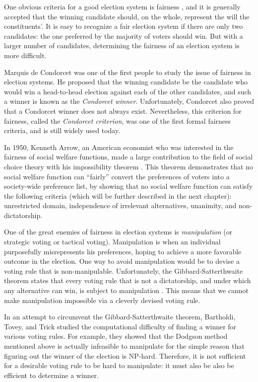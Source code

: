 	One obvious criteria for a good election system is fairness \cite{chevaleyre2006issues}, and it is generally accepted that the winning candidate should, on the whole, represent the will the constituents'. It is easy to recognize a fair election system if there are only two candidates: the one preferred by the majority of voters should win. But with a larger number of candidates, determining the fairness of an election system is more difficult.

	Marquis de Condorcet was one of the first people to study the issue of fairness in election systems. He proposed that the winning candidate be the candidate who would win a head-to-head election against each of the other candidates, and such a winner is known as the \emph{Condorcet winner}. Unfortunately, Condorcet also proved that a Condorcet winner does not always exist. Nevertheless, this criterion for fairness, called the \emph{Condorcet criterion}, was one of the first formal fairness criteria, and is still widely used today.

	In 1950, Kenneth Arrow, an American economist who was interested in the fairness of social welfare functions, made a large contribution to the field of social choice theory with his impossibility theorem \cite{arrow1950difficulty, arrow1963social}. This theorem demonstrates that no social welfare function can ``fairly'' convert the preferences of voters into a society-wide preference list, by showing that no social welfare function can satisfy the following criteria (which will be further described in the next chapter): unrestricted domain, independence of irrelevant alternatives, unanimity, and non-dictatorship.

	One of the great enemies of fairness in election systems is \emph{manipulation} (or strategic voting or tactical voting). Manipulation is when an individual purposefully misrepresents his preferences, hoping to achieve a more favorable outcome in the election. One way to avoid manipulation would be to devise a voting rule that is non-manipulable. Unfortunately, the Gibbard-Satterthwaite theorem states that every voting rule that is not a dictatorship, and under which any alternative can win, is subject to manipulation \cite{gibbard1973manipulation, satterthwaite1975strategy, duggan2000strategic}. This means that we cannot make manipulation impossible via a cleverly devised voting rule.

	In an attempt to circumvent the Gibbard-Satterthwaite theorem, Bartholdi, Tovey, and Trick studied the computational difficulty of finding a winner for various voting rules. For example, they showed that the Dodgson method mentioned above \cite{dodgson1876method} is actually infeasible to manipulate for the simple reason that figuring out the winner of the election is NP-hard. Therefore, it is not sufficient for a desirable voting rule to be hard to manipulate: it must also be also be efficient to determine a winner.

